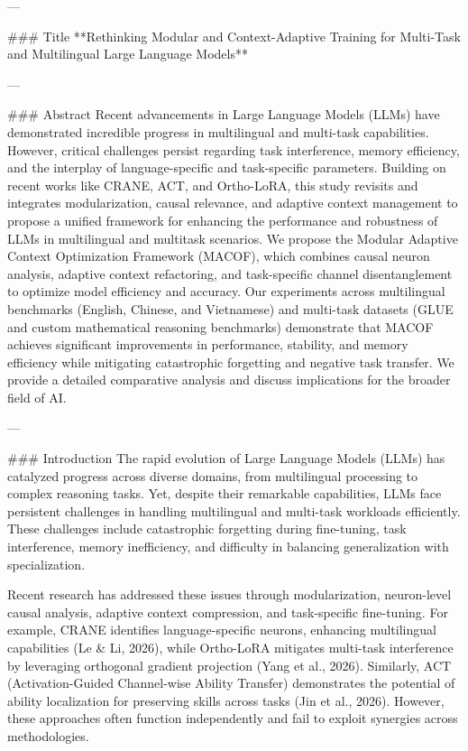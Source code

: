 ---

### Title
**Rethinking Modular and Context-Adaptive Training for Multi-Task and Multilingual Large Language Models**

---

### Abstract
Recent advancements in Large Language Models (LLMs) have demonstrated incredible progress in multilingual and multi-task capabilities. However, critical challenges persist regarding task interference, memory efficiency, and the interplay of language-specific and task-specific parameters. Building on recent works like CRANE, ACT, and Ortho-LoRA, this study revisits and integrates modularization, causal relevance, and adaptive context management to propose a unified framework for enhancing the performance and robustness of LLMs in multilingual and multitask scenarios. We propose the Modular Adaptive Context Optimization Framework (MACOF), which combines causal neuron analysis, adaptive context refactoring, and task-specific channel disentanglement to optimize model efficiency and accuracy. Our experiments across multilingual benchmarks (English, Chinese, and Vietnamese) and multi-task datasets (GLUE and custom mathematical reasoning benchmarks) demonstrate that MACOF achieves significant improvements in performance, stability, and memory efficiency while mitigating catastrophic forgetting and negative task transfer. We provide a detailed comparative analysis and discuss implications for the broader field of AI.

---

### Introduction
The rapid evolution of Large Language Models (LLMs) has catalyzed progress across diverse domains, from multilingual processing to complex reasoning tasks. Yet, despite their remarkable capabilities, LLMs face persistent challenges in handling multilingual and multi-task workloads efficiently. These challenges include catastrophic forgetting during fine-tuning, task interference, memory inefficiency, and difficulty in balancing generalization with specialization.

Recent research has addressed these issues through modularization, neuron-level causal analysis, adaptive context compression, and task-specific fine-tuning. For example, CRANE identifies language-specific neurons, enhancing multilingual capabilities (Le & Li, 2026), while Ortho-LoRA mitigates multi-task interference by leveraging orthogonal gradient projection (Yang et al., 2026). Similarly, ACT (Activation-Guided Channel-wise Ability Transfer) demonstrates the potential of ability localization for preserving skills across tasks (Jin et al., 2026). However, these approaches often function independently and fail to exploit synergies across methodologies.

